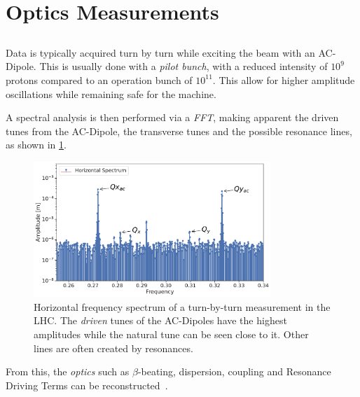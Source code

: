 \section{Optics Measurements}



\subsection{}

Data is typically acquired turn by turn while exciting the beam with an AC-Dipole. This is usually
done with a \textit{pilot bunch}, with a reduced intensity of $10^{9}$ protons compared to
an operation bunch of $10^{11}$. This allow for higher amplitude oscillations while remaining safe 
for the machine.

A spectral analysis is then performed via a \textit{FFT}, making apparent the driven tunes from the 
AC-Dipole, the transverse tunes and the possible resonance lines, as shown in
\cref{fig:optics_measurements:tbt_data:spectrum}.

\begin{figure}[H]
    \centering
    \includegraphics[width=0.8\textwidth]{./images/basic_spectrum.pdf}
    \caption{Horizontal frequency spectrum of a turn-by-turn measurement in the LHC. The 
    \textit{driven} tunes of the AC-Dipoles have the highest amplitudes while the natural tune can
    be seen close to it. Other lines are often created by resonances.}
    \label{fig:optics_measurements:tbt_data:spectrum}
\end{figure}

From this, the \textit{optics} such as $\beta$-beating, dispersion, coupling and Resonance Driving
Terms can be reconstructed~\cite{catalan-lasheras_linear_2004}.



